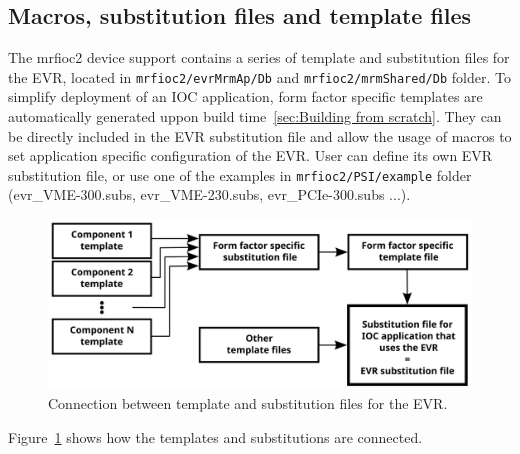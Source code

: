 \documentclass[12pt,a4paper]{article}
\begin{document}


\subsection{Macros, substitution files and template files}\label{sec:Macros}
The mrfioc2 device support contains a series of template and substitution files for the EVR, located in \texttt{mrfioc2/evrMrmAp/Db} and \texttt{mrfioc2/mrmShared/Db} folder. To simplify deployment of an IOC application, form factor specific templates are automatically generated uppon build time~\ref{sec:Building from scratch}. They can be directly included in the EVR substitution file and allow the usage of macros to set application specific configuration of the EVR. User can define its own EVR substitution file, or use one of the examples in \texttt{mrfioc2/PSI/example} folder (evr\_VME-300.subs, evr\_VME-230.subs, evr\_PCIe-300.subs ...).
\begin{figure}[H]
	\centering
	\includegraphics[width=\columnwidth]{./img/templates}
	\caption{Connection between template and substitution files for the EVR.}
	\label{fig:templates}
\end{figure}
Figure~\ref{fig:templates} shows how the templates and substitutions are connected.
\end{document}
